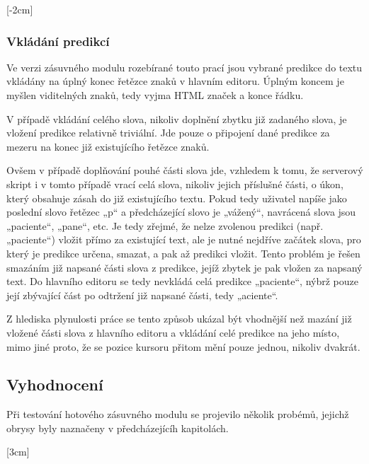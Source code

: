 \documentclass{article}
\begin{document}
[-2cm]

\subsubsection{Vkládání predikcí}

Ve verzi zásuvného modulu rozebírané touto prací jsou vybrané predikce do textu vkládány na úplný konec řetězce znaků v hlavním editoru. Úplným koncem je myšlen viditelných znaků, tedy vyjma HTML značek a konce řádku.

V případě vkládání celého slova, nikoliv doplnění zbytku již zadaného slova, je vložení predikce relativně triviální. Jde pouze o připojení dané predikce za mezeru na konec již existujícího řetězce znaků. 

Ovšem v případě doplňování pouhé části slova jde, vzhledem k tomu, že serverový skript i v tomto případě vrací celá slova, nikoliv jejich příslušné části, o úkon, který obsahuje zásah do již existujícího textu. Pokud tedy uživatel napíše jako poslední slovo řetězec „p“ a předcházející slovo je „vážený“, navrácená slova jsou „paciente“, „pane“, etc. Je tedy zřejmé, že nelze zvolenou predikci (např. „paciente“) vložit přímo za existující text, ale je nutné nejdříve začátek slova, pro který je predikce určena, smazat, a pak až predikci vložit. Tento problém je řešen smazáním již napsané části slova z predikce, jejíž zbytek je pak vložen za napsaný text. Do hlavního editoru se tedy nevkládá celá predikce „paciente“, nýbrž pouze její zbývající část po odtržení již napsané části, tedy „aciente“.

Z hlediska plynulosti práce se tento způsob ukázal být vhodnější než mazání již vložené části slova z hlavního editoru a vkládání celé predikce na jeho místo, mimo jiné proto, že se pozice kursoru přitom mění pouze jednou, nikoliv dvakrát.

\subsection{Vyhodnocení}

Při testování hotového zásuvného modulu se projevilo několik probémů, jejichž obrysy byly naznačeny v předcházejícíh kapitolách. 

[3cm]
\end{document}
